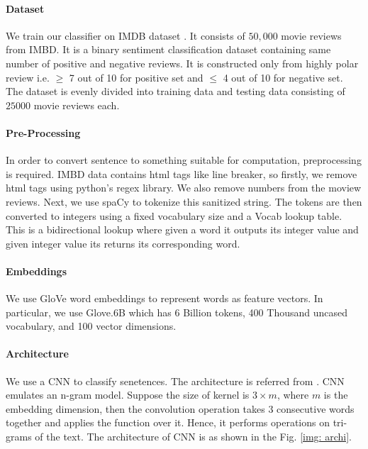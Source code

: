 \documentclass[12pt]{report}
\begin{document}
\begin{spacing}{1.5}
 \paragraph{Dataset}
We train our classifier on IMDB dataset \cite{imdb}. It consists of $50,000$ movie reviews from IMBD. It is a binary sentiment classification dataset containing same number of positive and negative reviews. It is constructed only from highly polar review i.e. $\geq$ 7 out of 10 for positive set and $\leq$ 4 out of 10 for negative set. The dataset is evenly divided into training data and testing data consisting of $25000$ movie reviews each.

\paragraph{Pre-Processing}
In order to convert sentence to something suitable for computation, preprocessing is required.
IMBD data contains html tags like line breaker, so firstly, we remove html tags using python's regex library. We also remove numbers from the moview reviews.
Next, we use spaCy \cite{spacy} to tokenize this sanitized string.
The tokens are then converted to integers using a fixed vocabulary size and a Vocab lookup table. This is a bidirectional lookup where given a word it outputs its integer value and given integer value its returns its corresponding word.
 
\paragraph{Embeddings}
We use GloVe \cite{glove} word embeddings to represent words as feature vectors.
In particular, we use Glove.6B which has 6 Billion tokens, 400 Thousand uncased vocabulary, and 100 vector dimensions.

\paragraph{Architecture}
We use a CNN to classify senetences. The architecture is referred from \cite{kim2014}.
CNN emulates an n-gram model. Suppose the size of kernel is $3 \times m$, where $m$ is the embedding dimension, then the convolution operation takes $3$ consecutive words together and applies the function over it. Hence, it performs operations on tri-grams of the text.
The architecture of CNN is as shown in the Fig. \ref{img: archi}.


\end{spacing}
\end{document}

